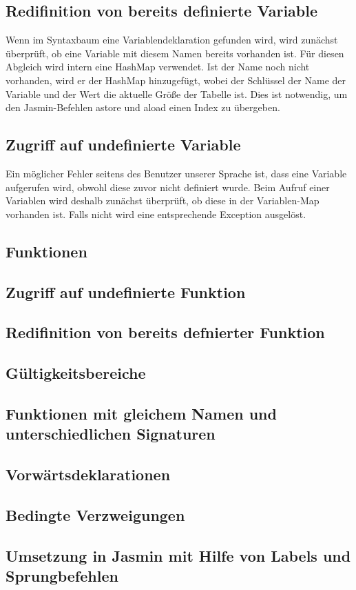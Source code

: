 \subsection*{Redifinition von bereits definierte Variable}
Wenn im Syntaxbaum eine Variablendeklaration gefunden wird, wird zunächst überprüft, ob eine Variable mit diesem Namen bereits vorhanden ist. Für diesen Abgleich wird intern eine HashMap verwendet. Ist der Name noch nicht vorhanden, wird er der HashMap hinzugefügt, wobei der Schlüssel der Name der Variable und der Wert die aktuelle Größe der Tabelle ist. Dies ist notwendig, um den Jasmin-Befehlen astore und aload einen Index  zu übergeben.

\subsection*{Zugriff auf undefinierte Variable}
Ein möglicher Fehler seitens des Benutzer unserer Sprache ist, dass eine Variable aufgerufen wird, obwohl diese zuvor nicht definiert wurde. Beim Aufruf einer Variablen wird deshalb zunächst überprüft, ob diese in der Variablen-Map vorhanden ist. Falls nicht wird eine entsprechende Exception ausgelöst.


\subsection{Funktionen}
\subsection*{Zugriff auf undefinierte Funktion}
\subsection*{Redifinition von bereits defnierter Funktion}
\subsection*{Gültigkeitsbereiche}
\subsection*{Funktionen mit gleichem Namen und unterschiedlichen Signaturen}
\subsection*{Vorwärtsdeklarationen}

\subsection{Bedingte Verzweigungen}
\subsection*{Umsetzung in Jasmin mit Hilfe von Labels und Sprungbefehlen}



